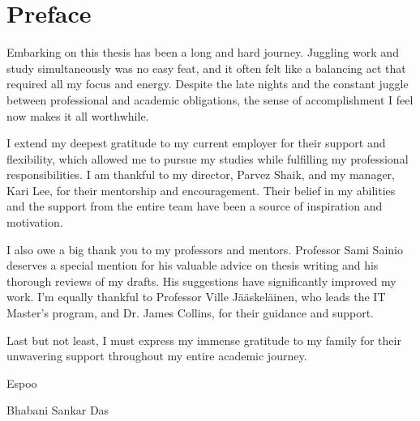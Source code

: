 
\pagestyle{empty}
\chapter*{Preface}

Embarking on this thesis has been a long and hard journey.
Juggling work and study simultaneously was no easy feat, and
it often felt like a balancing act that required all my focus and energy.
Despite the late nights and the constant juggle between professional and
academic obligations, the sense of accomplishment I feel now makes it all
worthwhile.

I extend my deepest gratitude to my current employer for their support and
flexibility, which allowed me to pursue my studies while fulfilling my
professional responsibilities. I am thankful to my director, Parvez
Shaik, and my manager, Kari Lee, for their mentorship and encouragement. Their
belief in my abilities and the support from the entire team have been a source
of inspiration and motivation.

I also owe a big thank you to my professors and mentors. Professor Sami Sainio
deserves a special mention for his valuable advice on thesis writing and his
thorough reviews of my drafts. His suggestions have significantly improved my
work. I'm equally thankful to Professor Ville Jääskeläinen, who leads the IT
Master's program, and Dr. James Collins, for their guidance and support.

Last but not least, I must express my immense gratitude to my family for their
unwavering support throughout my entire academic journey.

Espoo

Bhabani Sankar Das

\clearpage

